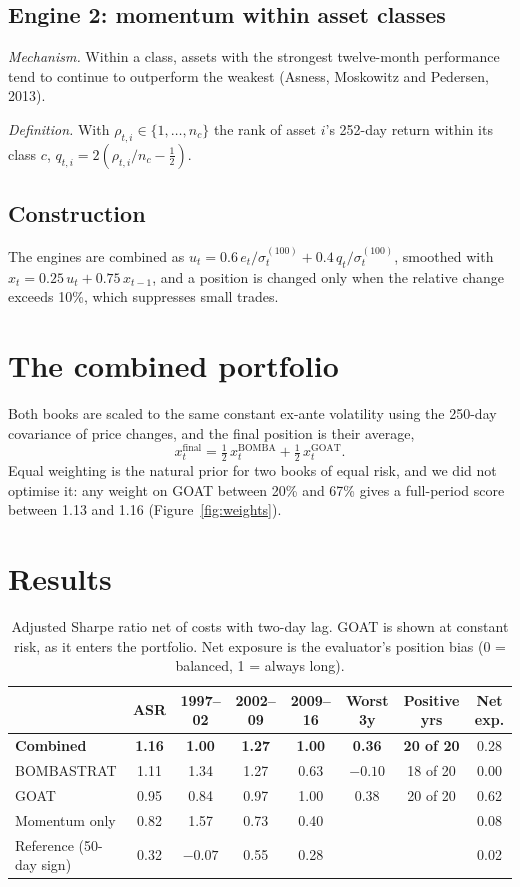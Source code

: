 \documentclass[10.5pt,a4paper]{article}
\begin{document}
\subsection{Engine 2: momentum within asset classes}
\textit{Mechanism.} Within a class, assets with the strongest twelve-month performance tend to continue to outperform the weakest (Asness, Moskowitz and Pedersen, 2013).

\textit{Definition.} With $\rho_{t,i}\in\{1,\dots,n_c\}$ the rank of asset $i$'s 252-day return within its class $c$, $q_{t,i}=2(\rho_{t,i}/n_c-\tfrac12)$.

\subsection{Construction}
The engines are combined as $u_t=0.6\,e_t/\sigma^{(100)}_t+0.4\,q_t/\sigma^{(100)}_t$, smoothed with $x_t=0.25\,u_t+0.75\,x_{t-1}$, and a position is changed only when the relative change exceeds 10\%, which suppresses small trades.

\section{The combined portfolio}
Both books are scaled to the same constant ex-ante volatility using the 250-day covariance of price changes, and the final position is their average,
\begin{equation}
x^{\mathrm{final}}_t=\tfrac12\,x^{\mathrm{BOMBA}}_t+\tfrac12\,x^{\mathrm{GOAT}}_t .
\end{equation}
Equal weighting is the natural prior for two books of equal risk, and we did not optimise it: any weight on GOAT between 20\% and 67\% gives a full-period score between 1.13 and 1.16 (Figure~\ref{fig:weights}).

\section{Results}
\begin{table}[h]
\centering\small
\setlength{\tabcolsep}{4.5pt}\begin{tabular}{lccccccc}
\toprule
 & ASR & 1997--02 & 2002--09 & 2009--16 & Worst 3y & Positive yrs & Net exp. \\
\midrule
\textbf{Combined} & \textbf{1.16} & \textbf{1.00} & \textbf{1.27} & \textbf{1.00} & \textbf{0.36} & \textbf{20 of 20} & 0.28 \\
BOMBASTRAT & 1.11 & 1.34 & 1.27 & 0.63 & $-0.10$ & 18 of 20 & 0.00 \\
GOAT & 0.95 & 0.84 & 0.97 & 1.00 & 0.38 & 20 of 20 & 0.62 \\
Momentum only & 0.82 & 1.57 & 0.73 & 0.40 & & & 0.08 \\
Reference (50-day sign) & 0.32 & $-0.07$ & 0.55 & 0.28 & & & 0.02 \\
\bottomrule
\end{tabular}
\caption{Adjusted Sharpe ratio net of costs with two-day lag. GOAT is shown at constant risk, as it enters the portfolio. Net exposure is the evaluator's position bias (0 = balanced, 1 = always long).}
\end{table}
\end{document}
